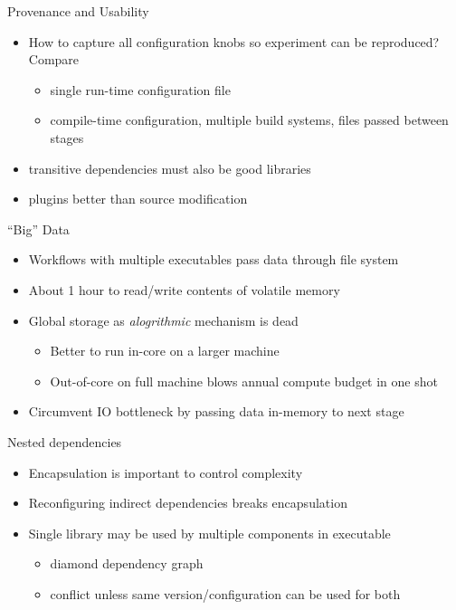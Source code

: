\documentclass{beamer}
\begin{document}
\begin{frame}{Provenance and Usability}
  \begin{itemize}
  \item How to capture all configuration knobs so experiment can be reproduced?  Compare
    \begin{itemize}
    \item single run-time configuration file
    \item compile-time configuration, multiple build systems, files passed between stages
    \end{itemize}
  \item transitive dependencies must also be good libraries
  \item plugins better than source modification
  \end{itemize}
\end{frame}

\begin{frame}{``Big'' Data}
  \begin{itemize}
  \item Workflows with multiple executables pass data through file system
  \item About 1 hour to read/write contents of volatile memory
  \item Global storage as \emph{alogrithmic} mechanism is dead
    \begin{itemize}
    \item Better to run in-core on a larger machine
    \item Out-of-core on full machine blows annual compute budget in one shot
    \end{itemize}
  \item Circumvent IO bottleneck by passing data in-memory to next stage
  \end{itemize}
\end{frame}

\begin{frame}{Nested dependencies}
  \begin{itemize}
  \item Encapsulation is important to control complexity
  \item Reconfiguring indirect dependencies breaks encapsulation
  \item Single library may be used by multiple components in executable
    \begin{itemize}
    \item diamond dependency graph
    \item conflict unless same version/configuration can be used for both
    \end{itemize}
  \end{itemize}
\end{frame}
\end{document}
